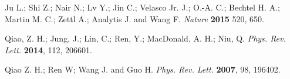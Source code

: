 \documentclass[journal=nalefd,manuscript=communication]{achemso}
\begin{document}
\begin{thebibliography}{99}
Ju L.; Shi Z.; Nair N.; Lv Y.; Jin C.; Velasco Jr. J.; O.-A. C.; Bechtel H. A.; Martin M. C.; Zettl A.; Analytis J. and Wang F. \textit{Nature} \textbf{2015} 520, 650.

Qiao, Z. H.; Jung, J.; Lin, C.; Ren, Y.; MacDonald, A. H.; Niu, Q. \textit{Phys. Rev. Lett.} \textbf{2014}, 112, 206601.

Qiao Z. H.; Ren W; Wang J. and Guo H. \textit{Phys. Rev. Lett.} \textbf{2007}, 98, 196402.

\end{thebibliography}
\end{document}
